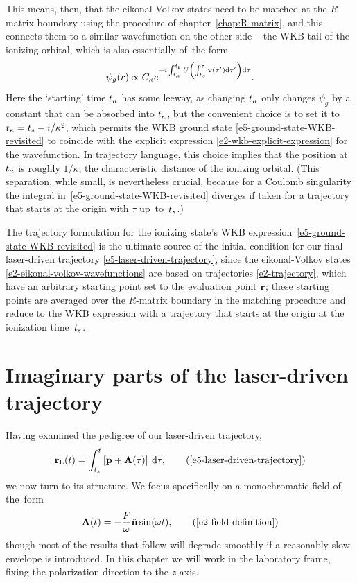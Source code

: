 This means, then, that the eikonal Volkov states need to be matched at the $R$-matrix boundary using the procedure of chapter~\ref{chap:R-matrix}, and this connects them to a similar wavefunction on the other side -- the WKB tail of the ionizing orbital, which is also essentially of~the form
\begin{equation}
\psi_g(r) \propto C_\kappa e^{-i\int_{{t_\kappa}}^{{t_{\vb{r}}}}U\left(\int_{{t_s}}^\tau \vb{v}(\tau')\mathrm{d}\tau' \right)\mathrm{d}\tau}.
\label{e5-ground-state-WKB-revisited}
\end{equation}
Here the `starting' time ${t_\kappa}$ has some leeway, as changing ${t_\kappa}$ only changes $\psi_g$ by a constant that can be absorbed into ${t_\kappa}$, but the convenient choice is to set it to ${t_\kappa}={t_s}-i/\kappa^2$, which permits the WKB ground state \eqref{e5-ground-state-WKB-revisited} to coincide with the explicit expression \eqref{e2-wkb-explicit-expression} for the wavefunction. In trajectory language, this choice implies that the position at ${t_\kappa}$ is roughly $1/\kappa$, the characteristic distance of the ionizing orbital. (This separation, while small, is nevertheless crucial, because for a Coulomb singularity the integral in~\eqref{e5-ground-state-WKB-revisited} diverges if taken for a trajectory that starts at the origin with $\tau$ up~to~${t_s}$.)

The trajectory formulation for the ionizing state's WKB expression~\eqref{e5-ground-state-WKB-revisited} is the ultimate source of the initial condition for our final laser-driven trajectory \eqref{e5-laser-driven-trajectory}, since the eikonal-Volkov states \eqref{e2-eikonal-volkov-wavefunctions} are based on trajectories \eqref{e2-trajectory}, which have an arbitrary starting point set to the evaluation point $\vb{r}$; these starting points are averaged over the $R$-matrix boundary in the matching procedure and reduce to the WKB expression with a trajectory that starts at the origin at the ionization time~${t_s}$.










\section{Imaginary parts of the laser-driven trajectory}
Having examined the pedigree of our laser-driven trajectory, 
\begin{equation}
\rl(t) = \int_{\ts}^{t} \left[\vbp+\vba(\tau) \right] \: \d\tau
,
\backtag{e5-laser-driven-trajectory}
\end{equation}
we now turn to its structure. We focus specifically on a monochromatic field of the~form
\begin{equation}
\vba(t)=-\frac{F}{\omega}\un \sin(\omega t),
\backtag{e2-field-definition}
\end{equation}
though most of the results that follow will degrade smoothly if a reasonably slow envelope is introduced. In this chapter we will work in the laboratory frame, fixing the polarization direction to the $z$ axis.

